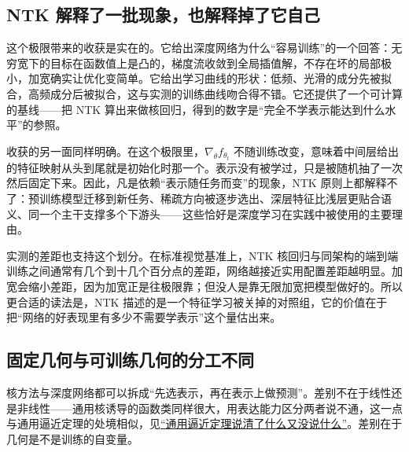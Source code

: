 \subsection{NTK 解释了一批现象，也解释掉了它自己}

这个极限带来的收获是实在的。它给出深度网络为什么``容易训练''的一个回答：无穷宽下的目标在函数值上是凸的，梯度流收敛到全局插值解，不存在坏的局部极小，加宽确实让优化变简单。它给出学习曲线的形状：低频、光滑的成分先被拟合，高频成分后被拟合，这与实测的训练曲线吻合得不错。它还提供了一个可计算的基线——把 NTK 算出来做核回归，得到的数字是``完全不学表示能达到什么水平''的参照。

收获的另一面同样明确。在这个极限里，\(\nabla_\theta f_{\theta_t}\) 不随训练改变，意味着中间层给出的特征映射从头到尾就是初始化时那一个。表示没有被学过，只是被随机抽了一次然后固定下来。因此，凡是依赖``表示随任务而变''的现象，NTK 原则上都解释不了：预训练模型迁移到新任务、稀疏方向被逐步选出、深层特征比浅层更贴合语义、同一个主干支撑多个下游头——这些恰好是深度学习在实践中被使用的主要理由。

实测的差距也支持这个划分。在标准视觉基准上，NTK 核回归与同架构的端到端训练之间通常有几个到十几个百分点的差距，网络越接近实用配置差距越明显。加宽会缩小差距，因为加宽正是往极限靠；但没人是靠无限加宽把模型做好的。所以更合适的读法是，NTK 描述的是一个特征学习被关掉的对照组，它的价值在于把``网络的好表现里有多少不需要学表示''这个量估出来。

\subsection{固定几何与可训练几何的分工不同}

核方法与深度网络都可以拆成``先选表示，再在表示上做预测''。差别不在于线性还是非线性——通用核诱导的函数类同样很大，用表达能力区分两者说不通，这一点与通用逼近定理的处境相似，见\hyperref[sec:14-Deep-Learning/01-Representation-and-Approximation/02]{``通用逼近定理说清了什么又没说什么''}。差别在于几何是不是训练的自变量。

